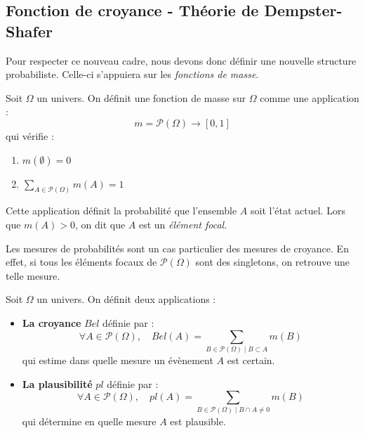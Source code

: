 \subsection{Fonction de croyance - Théorie de Dempster-Shafer}

Pour respecter ce nouveau cadre, nous devons donc définir une nouvelle structure probabiliste. 
Celle-ci s'appuiera sur les \emph{fonctions de masse}. 

\begin{definition}
    Soit $ \Omega$ un univers. On définit une fonction de masse sur $ \Omega$ comme une application : 
        \begin{equation}
            m = \mathcal{P}( \Omega) \longrightarrow [0,1] 
        \end{equation}
    qui vérifie : 
    \begin{enumerate}[label=\roman*)]
        \item $ m(\emptyset) = 0 $ 
        \item $ \displaystyle \sum_{A \in \mathcal{P}( \Omega)} m(A) = 1$
    \end{enumerate}
    Cette application définit la probabilité que l'ensemble $A$ soit l'état actuel. Lors que $m(A) > 0$, on dit 
    que $A$ est un \emph{élément focal}. 
\end{definition}

\begin{remark}
    Les mesures de probabilités sont un cas particulier des mesures de croyance. En effet, si tous les éléments 
    focaux de $ \mathcal{P}( \Omega)$ sont des singletons, on retrouve une telle mesure. 
\end{remark}

\begin{definition}
    Soit $ \Omega$ un univers. On définit deux applications : 
    \begin{itemize}
        \item \textbf{La croyance} $Bel$ définie par : 
            \begin{equation}
                \boxed{\forall A \in \mathcal{P}( \Omega), \quad Bel(A) = \sum_{B \in \mathcal{P}( \Omega) \mid B \subset A} m(B)} 
            \end{equation}
            qui estime dans quelle mesure un évènement $A$ est certain. 
        \item \textbf{La plausibilité} $pl$ définie par : 
            \begin{equation}
                \boxed{\forall A \in \mathcal{P}( \Omega), \quad pl(A) = \sum_{B \in \mathcal{P}( \Omega) \mid B \cap A \not = 0} m(B)}
            \end{equation}
            qui détermine en quelle mesure $A$ est plausible. 
    \end{itemize}
\end{definition}

